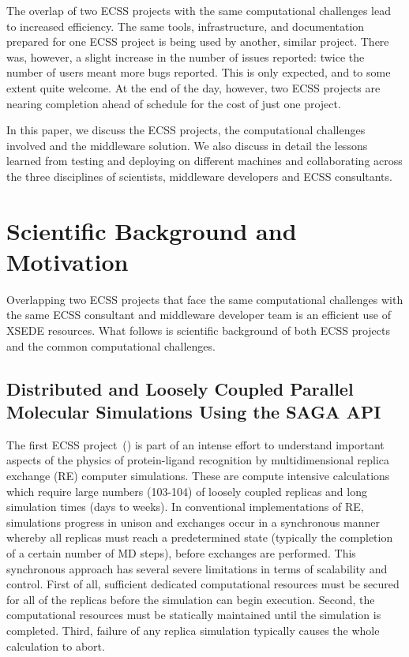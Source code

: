 \documentclass{sig-alternate}
\begin{document}
The overlap of two ECSS projects with the same computational challenges lead to
increased efficiency. The same tools, infrastructure, and documentation prepared
for one ECSS project is being used by another, similar project. There was,
however, a slight increase in the number of issues reported: twice the number
of users meant more bugs reported. This is only expected, and to some extent
quite welcome.  
At the end of the day, however, two ECSS projects are nearing
completion ahead of schedule for the cost of just one project.

In this paper, we discuss the ECSS projects, the computational challenges
involved and the middleware solution. We also discuss in detail the lessons
learned from testing and deploying on different machines and collaborating
across the three disciplines of scientists, middleware developers and ECSS
consultants.



\section{Scientific Background and Motivation}

Overlapping two ECSS projects that face the same computational challenges
with the same ECSS consultant and middleware developer team is an efficient
use of XSEDE resources. What follows is scientific background of both ECSS projects
and the common computational challenges.

\subsection{Distributed and Loosely Coupled Parallel Molecular Simulations
Using the SAGA API}
The first ECSS project~(\cite{RonLevy}) is part of an intense effort to
understand
important aspects of the physics of protein-ligand recognition by
multidimensional replica exchange (RE) computer simulations. These are
compute intensive calculations which require large numbers (103-104) of
loosely coupled replicas and long simulation times (days to weeks). In
conventional implementations of RE, simulations progress in unison and
exchanges occur in a synchronous manner whereby all replicas must
reach a predetermined state (typically the completion of a certain
number of MD steps), before exchanges are performed. This synchronous
approach has several severe limitations in terms of scalability and
control. First of all, sufficient dedicated computational resources must
be secured for all of the replicas before the simulation can begin
execution. Second, the computational resources must be statically
maintained until the simulation is completed. Third, failure of any
replica simulation typically causes the whole calculation to abort.
\end{document}

